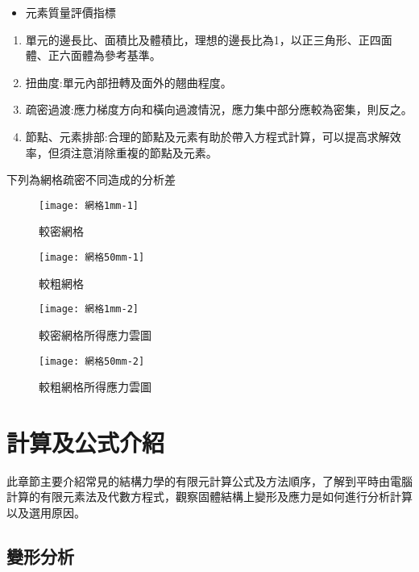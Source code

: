\begin{itemize}
\item 元素質量評價指標
\end{itemize}
\begin{enumerate}
\item 單元的邊長比、面積比及體積比，理想的邊長比為1，以正三角形、正四面體、正六面體為參考基準。
\item 扭曲度:單元內部扭轉及面外的翹曲程度。
\item 疏密過渡:應力梯度方向和橫向過渡情況，應力集中部分應較為密集，則反之。
\item 節點、元素排部:合理的節點及元素有助於帶入方程式計算，可以提高求解效率，但須注意消除重複的節點及元素。
\end{enumerate}

下列為網格疏密不同造成的分析差\

\begin{figure}[htbp]
  \centering
  \begin{minipage}{0.5\textwidth}
    \centering
    \texttt{[image: 網格1mm-1]}
    \caption{較密網格}
    \label{網格1mm-1}
  \end{minipage}
  \hfill
  \begin{minipage}{0.5\textwidth}
    \centering
    \texttt{[image: 網格50mm-1]}
    \caption{較粗網格}
    \label{網格1mm-2}
  \end{minipage}
  
  \begin{minipage}{0.5\textwidth}
    \centering
    \texttt{[image: 網格1mm-2]}
    \caption{較密網格所得應力雲圖}
    \label{網格50mm-1}
  \end{minipage}
  \hfill
  \begin{minipage}{0.5\textwidth}
    \centering
    \texttt{[image: 網格50mm-2]}
    \caption{較粗網格所得應力雲圖}
    \label{網格50mm-2}
  \end{minipage}
\end{figure}
\newpage

\section{計算及公式介紹}
此章節主要介紹常見的結構力學的有限元計算公式及方法順序，了解到平時由電腦計算的有限元素法及代數方程式，觀察固體結構上變形及應力是如何進行分析計算以及選用原因。\\

\subsection{變形分析}

